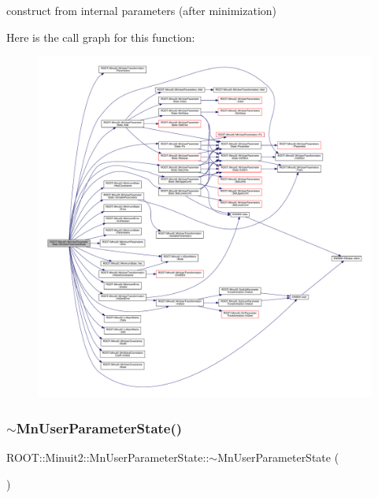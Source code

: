 construct from internal parameters (after minimization) 

Here is the call graph for this function\+:
\nopagebreak
\begin{figure}[H]
\begin{center}
\leavevmode
\includegraphics[width=350pt]{d3/de0/classROOT_1_1Minuit2_1_1MnUserParameterState_a8214c3f41958849f1aaae4865bb5b129_cgraph}
\end{center}
\end{figure}
\mbox{\label{classROOT_1_1Minuit2_1_1MnUserParameterState_a3a5a64a086b883f61febd02676c0d151}} 
\subsubsection{\texorpdfstring{$\sim$MnUserParameterState()}{~MnUserParameterState()}\hspace{0.1cm}{\footnotesize\ttfamily [1/3]}}
{\footnotesize\ttfamily R\+O\+O\+T\+::\+Minuit2\+::\+Mn\+User\+Parameter\+State\+::$\sim$\+Mn\+User\+Parameter\+State (\begin{DoxyParamCaption}{ }\end{DoxyParamCaption})\hspace{0.3cm}{\ttfamily [inline]}}

